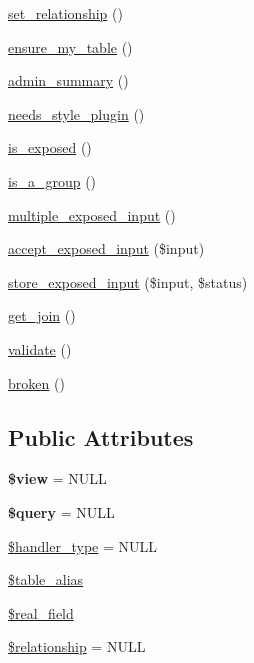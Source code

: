 \begin{DoxyCompactItemize}
\hyperlink{classviews__handler_ac54ea4553cbc678d23b51dfad3142a54}{set\_\-relationship} ()
\item 
\hyperlink{classviews__handler_a947f21ef0f21a77f4d103af4702b3600}{ensure\_\-my\_\-table} ()
\item 
\hyperlink{classviews__handler_a27a5cb35f3f17322957730a95b6be11e}{admin\_\-summary} ()
\item 
\hyperlink{classviews__handler_a53baa97a6c218ce4b847c8fb4e65a350}{needs\_\-style\_\-plugin} ()
\item 
\hyperlink{classviews__handler_a0c01527c54c1f1372f3c4f28ae34a837}{is\_\-exposed} ()
\item 
\hyperlink{classviews__handler_a946a9b922261327ff2f59a0287e6b288}{is\_\-a\_\-group} ()
\item 
\hyperlink{classviews__handler_a31b0961d9c04ea88289b1a0b34d08ab1}{multiple\_\-exposed\_\-input} ()
\item 
\hyperlink{classviews__handler_a20433153babc3196b26ee773755a709e}{accept\_\-exposed\_\-input} (\$input)
\item 
\hyperlink{classviews__handler_a7f2453d86d3cb3850826e8c921012f16}{store\_\-exposed\_\-input} (\$input, \$status)
\item 
\hyperlink{classviews__handler_ac05dca8ea852b137f7f288d090a49221}{get\_\-join} ()
\item 
\hyperlink{classviews__handler_a323961657c7c5f3257a8fe4eeea1502f}{validate} ()
\item 
\hyperlink{classviews__handler_ac1cd2ff30cb558c79cc908be516fb725}{broken} ()
\end{DoxyCompactItemize}
\subsection*{Public Attributes}
\begin{DoxyCompactItemize}
\item 
\hypertarget{classviews__handler_a1c694293a049b4ab89a031083bcda561}{
{\bfseries \$view} = NULL}
\label{classviews__handler_a1c694293a049b4ab89a031083bcda561}

\item 
\hypertarget{classviews__handler_a49a252f089f78dc4f67b7899a5002bd3}{
{\bfseries \$query} = NULL}
\label{classviews__handler_a49a252f089f78dc4f67b7899a5002bd3}

\item 
\hyperlink{classviews__handler_afb557031e6624ae31b4dfa14b4c7cc64}{\$handler\_\-type} = NULL
\item 
\hyperlink{classviews__handler_aa894a021af549bd94123702f252d2f12}{\$table\_\-alias}
\item 
\hyperlink{classviews__handler_a5920055a18e5fd31ac515f990bad81de}{\$real\_\-field}
\item 
\hyperlink{classviews__handler_a54677c1b1f0ae2b6df91b99e454a4b45}{\$relationship} = NULL
\end{DoxyCompactItemize}


